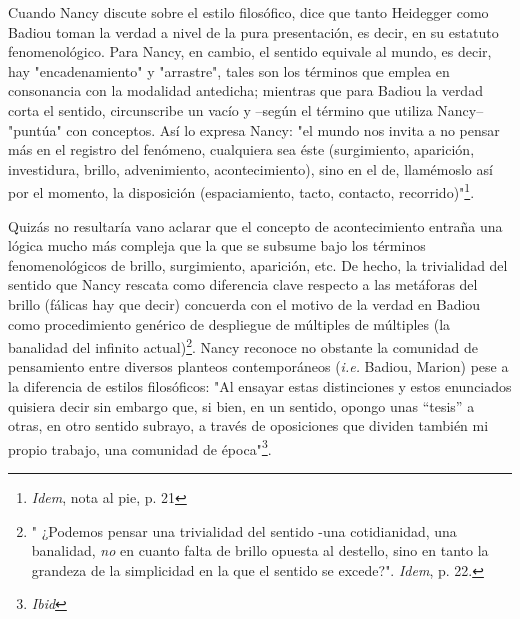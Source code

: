\documentclass{book}
\begin{document}
Cuando Nancy discute sobre el estilo filosófico, dice que tanto
Heidegger como Badiou toman la verdad a nivel de la pura presentación,
es decir, en su estatuto fenomenológico. Para Nancy, en cambio, el
sentido equivale al mundo, es decir, hay "encadenamiento" y "arrastre",
tales son los términos que emplea en consonancia con la modalidad
antedicha; mientras que para Badiou la verdad corta el sentido,
circunscribe un vacío y --según el término que utiliza Nancy-- "puntúa"
con conceptos. Así lo expresa Nancy: "el mundo nos invita a no pensar
más en el registro del fenómeno, cualquiera sea éste (surgimiento,
aparición, investidura, brillo, advenimiento, acontecimiento), sino en
el de, llamémoslo así por el momento, la disposición (espaciamiento,
tacto, contacto, recorrido)"\footnote{\emph{Idem}, nota al pie, p. 21}.

Quizás no resultaría vano aclarar que el concepto de acontecimiento
entraña una lógica mucho más compleja que la que se subsume bajo los
términos fenomenológicos de brillo, surgimiento, aparición, etc. De
hecho, la trivialidad del sentido que Nancy rescata como diferencia
clave respecto a las metáforas del brillo (fálicas hay que decir)
concuerda con el motivo de la verdad en Badiou como procedimiento
genérico de despliegue de múltiples de múltiples (la banalidad del
infinito actual)\footnote{" ¿Podemos pensar una trivialidad del sentido
  -una cotidianidad, una banalidad, \emph{no} en cuanto falta de brillo
  opuesta al destello, sino en tanto la grandeza de la simplicidad en la
  que el sentido se excede?". \emph{Idem}, p. 22.}. Nancy reconoce no
obstante la comunidad de pensamiento entre diversos planteos
contemporáneos (\emph{i.e.} Badiou, Marion) pese a la diferencia de
estilos filosóficos: "Al ensayar estas distinciones y estos enunciados
quisiera decir sin embargo que, si bien, en un sentido, opongo unas
``tesis'' a otras, en otro sentido subrayo, a través de oposiciones que
dividen también mi propio trabajo, una comunidad de época"\footnote{\emph{Ibid}}.
\end{document}

